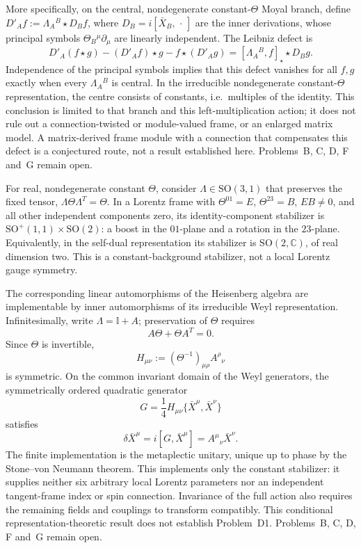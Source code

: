 More specifically, on the central, nondegenerate constant-\(\Theta\)
Moyal branch, define
\(D'_A f:=\Lambda_A{}^B\star D_B f\), where
\(D_B=i[\bar X_B,\,\cdot\,]\) are the inner derivations, whose
principal symbols \(\Theta_B{}^\mu\partial_\mu\) are linearly
independent. The Leibniz defect is
\[
  D'_A(f\star g)-(D'_Af)\star g-f\star(D'_Ag)
  =[\Lambda_A{}^B,f]_\star\star D_Bg .
\]
Independence of the principal symbols implies that this defect
vanishes for all \(f,g\) exactly when every \(\Lambda_A{}^B\) is
central. In the irreducible nondegenerate constant-\(\Theta\)
representation, the centre consists of constants, i.e.\ multiples of
the identity. This conclusion is limited to that branch and this
left-multiplication action; it does not rule out a connection-twisted
or module-valued frame, or an enlarged matrix model. A matrix-derived
frame module with a connection that compensates this defect is a
conjectured route, not a result established here. Problems~B, C, D, F
and~G remain open.

For real, nondegenerate constant \(\Theta\), consider
\(\Lambda\in\mathrm{SO}(3,1)\) that preserves the fixed tensor,
\(\Lambda\Theta\Lambda^T=\Theta\). In a Lorentz frame with
\(\Theta^{01}=E\), \(\Theta^{23}=B\), \(EB\ne0\), and all other
independent components zero, its identity-component stabilizer is
\(\mathrm{SO}^+(1,1)\times\mathrm{SO}(2)\): a boost in the
\(01\)-plane and a rotation in the \(23\)-plane. Equivalently, in
the self-dual representation its stabilizer is
\(\mathrm{SO}(2,\mathbb C)\), of real dimension two. This is a
constant-background stabilizer, not a local Lorentz gauge symmetry.

The corresponding linear automorphisms of the Heisenberg algebra
are implementable by inner automorphisms of its irreducible Weyl
representation. Infinitesimally, write \(\Lambda=\mathbb I+A\);
preservation of \(\Theta\) requires
\[
  A\Theta+\Theta A^T=0.
\]
Since \(\Theta\) is invertible,
\[
  H_{\mu\nu}:=(\Theta^{-1})_{\mu\rho}A^\rho{}_\nu
\]
is symmetric. On the common invariant domain of the Weyl
generators, the symmetrically ordered quadratic generator
\[
  G=\frac14 H_{\mu\nu}
    \{\bar X^\mu,\bar X^\nu\}
\]
satisfies
\[
  \delta\bar X^\mu=i[G,\bar X^\mu]
  =A^\mu{}_\nu\bar X^\nu.
\]
The finite implementation is the metaplectic unitary, unique up
to phase by the Stone--von Neumann theorem. This implements only
the constant stabilizer: it supplies neither six arbitrary local
Lorentz parameters nor an independent tangent-frame index or spin
connection. Invariance of the full action also requires the
remaining fields and couplings to transform compatibly. This
conditional representation-theoretic result does not establish
Problem~D1. Problems~B, C, D, F and~G remain open.

